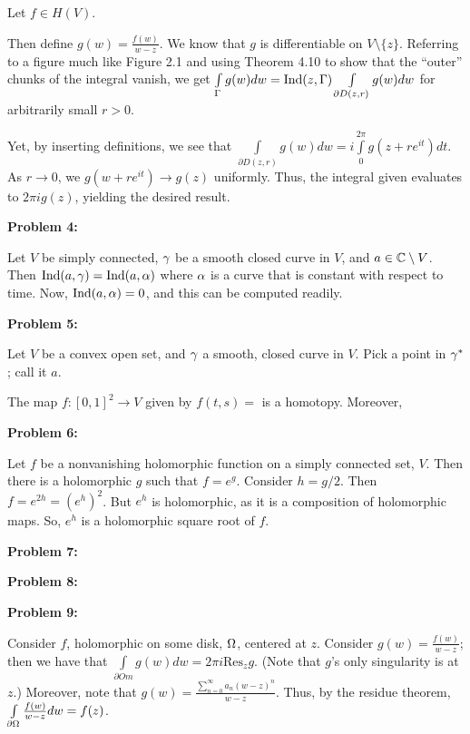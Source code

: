 \documentclass[a4paper,12pt]{article}
\begin{document}
Let $f \in H(V)$.

Then define $g(w) = \frac{f(w)}{w-z}$. We know that $g$ is differentiable on $V \setminus \{z\}$. Referring to a figure much like Figure 2.1 and using Theorem 4.10 to show that the ``outer'' chunks of the integral vanish, we get $\int\limits_{\Gamma} g(w) dw = \text{Ind}(z,\Gamma) \int\limits_{\partial D(z,r)} g(w)dw$ for arbitrarily small $r>0$.

Yet, by inserting definitions, we see that $\int\limits_{\partial D(z,r)} g(w) dw = i\int\limits_{0}^{2\pi} g(z+re^{it})dt$. As $r \to 0$, we $g(w+re^{it}) \to g(z)$ uniformly. Thus, the integral given evaluates to $2\pi i g(z)$, yielding the desired result.

\shunt

{\bf Problem 4:}

Let $V$ be simply connected, $\gamma$ be a smooth closed curve in $V$, and $a \in \mathbb{C} \setminus V$. Then $\text{Ind}(a, \gamma) = \text{Ind}(a, \alpha)$ where $\alpha$ is a curve that is constant with respect to time. Now, $\text{Ind}(a,\alpha) = 0$, and this can be computed readily.

\shunt

{\bf Problem 5:}

Let $V$ be a convex open set, and $\gamma$ a smooth, closed curve in $V$. Pick a point in $\gamma^*$; call it $a$.

The map $f: [0,1]^2 \to V$ given by $f(t,s) = $ is a homotopy. Moreover, %

\shunt

{\bf Problem 6:}

Let $f$ be a nonvanishing holomorphic function on a simply connected set, $V$. Then there is a holomorphic $g$ such that $f=e^g$. Consider $h=g/2$. Then $f=e^{2h} = (e^h)^2$. But $e^h$ is holomorphic, as it is a composition of holomorphic maps. So, $e^h$ is a holomorphic square root of $f$. 

\shunt

{\bf Problem 7:}

\shunt

{\bf Problem 8:}

\shunt

{\bf Problem 9:}

Consider $f$, holomorphic on some disk, $\Omega$, centered at $z$. Consider $g(w) = \frac{f(w)}{w-z}$; then we have that $\int\limits_{\partial Om} g(w) dw= 2\pi i \text{Res}_z g$. (Note that $g$'s only singularity is at $z$.) Moreover, note that $g(w) = \frac{\sum\limits_{n=0}^\infty a_n(w-z)^n}{w-z}$. Thus, by the residue theorem, $\int\limits_{\partial \Omega} \frac{f(w)}{w-z} dw = f(z)$. 
\end{document}
